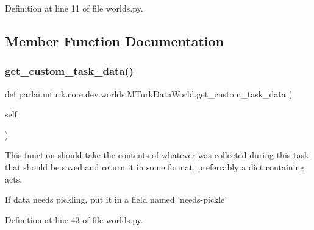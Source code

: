Definition at line 11 of file worlds.\+py.



\subsection{Member Function Documentation}
\mbox{\label{classparlai_1_1mturk_1_1core_1_1dev_1_1worlds_1_1MTurkDataWorld_af01360aeaa7e6ad524049621551683df}} 
\subsubsection{\texorpdfstring{get\+\_\+custom\+\_\+task\+\_\+data()}{get\_custom\_task\_data()}}
{\footnotesize\ttfamily def parlai.\+mturk.\+core.\+dev.\+worlds.\+M\+Turk\+Data\+World.\+get\+\_\+custom\+\_\+task\+\_\+data (\begin{DoxyParamCaption}\item[{}]{self }\end{DoxyParamCaption})}

\begin{DoxyVerb}This function should take the contents of whatever was collected during this
task that should be saved and return it in some format, preferrably a dict
containing acts.

If data needs pickling, put it in a field named 'needs-pickle'
\end{DoxyVerb}
 

Definition at line 43 of file worlds.\+py.


